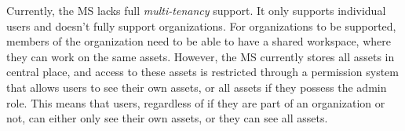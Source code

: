 



Currently, the MS lacks full \textit{multi-tenancy} support.
It only supports individual users and doesn't fully support organizations.
For organizations to be supported, members of the organization need to be able to have a
shared workspace, where they can work on the same assets.
However, the MS currently stores all assets in central place,
and access to these assets is restricted through a permission system that allows users to see
their own assets, or all assets if they possess the admin role.
This means that users, regardless of if they are part of an organization or not,
can either only see their own assets,  or they can see all assets.


